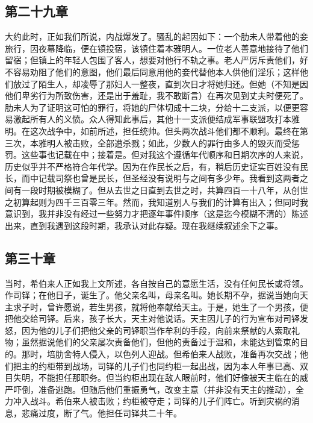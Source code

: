
\subsection{第二十九章}

大约此时，正如我们所说，内战爆发了。骚乱的起因如下：一个肋未人带着他的妾旅行，因夜幕降临，便在镇投宿，该镇住着本雅明人。一位老人善意地接待了他们留宿；但镇上的年轻人包围了客人，想要对他行不轨之事。老人严厉斥责他们，好不容易劝阻了他们的意图，他们最后同意用他的妾代替他本人供他们淫乐；这样他们放过了陌生人，却凌辱了那妇人一整夜，直到次日才将她归还。但她（不知是因他们卑劣行为所致伤害，还是出于羞耻，我不敢断言）在再次见到丈夫时便死了。肋未人为了证明这可怕的罪行，将她的尸体切成十二块，分给十二支派，以便更容易激起所有人的义愤。众人得知此事后，其他十一支派便结成军事联盟攻打本雅明。在这次战争中，如前所述，担任统帅。但头两次战斗他们都不顺利。最终在第三次，本雅明人被击败，全部遭杀戮；如此，少数人的罪行由多人的毁灭而受惩罚。这些事也记载在中；接着是。但对我这个遵循年代顺序和日期次序的人来说，历史似乎并不严格符合年代学。因为在作民长之后，有，稍后历史证实百姓没有民长，而中记载司祭也曾是民长，但圣经没有说明与之间有多少年。我看到这两者之间有一段时期被模糊了。但从去世之日直到去世之时，共算四百一十八年，从创世之初算起则为四千三百零三年。然而，我知道别人与我们的计算有出入；但同时我意识到，我并非没有经过一些努力才把逐年事件顺序（这是迄今模糊不清的）陈述出来，直到我遇到这段时期，我承认对此存疑。现在我继续叙述余下之事。\par


\subsection{第三十章}

当时，希伯来人正如我上文所述，各自按自己的意愿生活，没有任何民长或将领。作司铎；在他日子，诞生了。他父亲名叫，母亲名叫。她长期不孕，据说当她向天主求子时，曾许愿说，若生男孩，就将他奉献给天主。于是，她生了一个男孩，便把他交给司铎。后来，孩子长大，天主对他说话。天主因儿子的行为宣布对司铎发怒，因为他的儿子们把他父亲的司铎职当作牟利的手段，向前来祭献的人索取礼物；虽然据说他们的父亲屡次责备他们，但他的责备过于温和，未能达到管束的目的。那时，培肋舍特人侵入，以色列人迎战。但希伯来人战败，准备再次交战；他们把主的约柜带到战场，司铎的儿子们也同约柜一起出战，因为本人年事已高、双目失明，不能担任那职务。但当约柜出现在敌人眼前时，他们好像被天主临在的威严吓倒，准备逃跑。但随后他们重振勇气，改变主意（并非没有天主的推动），全力冲入战斗。希伯来人被击败；约柜被夺走；司铎的儿子们阵亡。听到灾祸的消息，悲痛过度，断了气。他担任司铎共二十年。\par

